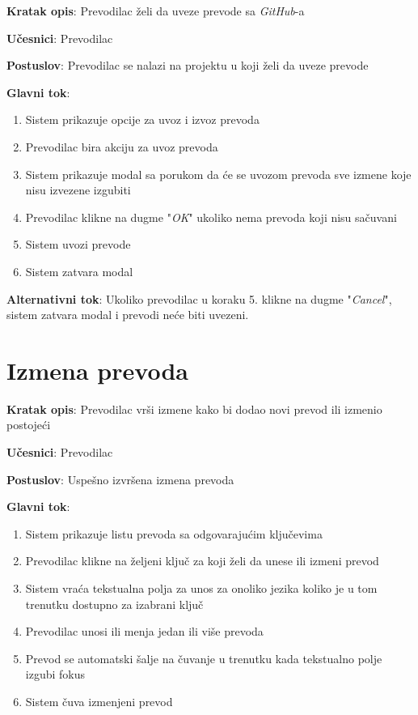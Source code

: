 \textbf{Kratak opis}: Prevodilac želi da uveze prevode sa \textit{GitHub}-a

\textbf{Učesnici}: Prevodilac

\textbf{Postuslov}: Prevodilac se nalazi na projektu u koji želi da uveze prevode

\textbf{Glavni tok}:
\begin{enumerate}
    \item Sistem prikazuje opcije za uvoz i izvoz prevoda
    \item Prevodilac bira akciju za uvoz prevoda
    \item Sistem prikazuje modal sa porukom da će se uvozom prevoda sve 
    izmene koje nisu izvezene izgubiti
    \item Prevodilac klikne na dugme "\textit{OK}" ukoliko nema prevoda koji nisu sačuvani
    \item Sistem uvozi prevode
    \item Sistem zatvara modal
\end{enumerate}

\textbf{Alternativni tok}: Ukoliko prevodilac u koraku 5. klikne na dugme "\textit{Cancel}", 
sistem zatvara modal i prevodi neće biti uvezeni.


\section{Izmena prevoda}

\textbf{Kratak opis}: Prevodilac vrši izmene kako bi dodao novi prevod ili izmenio postojeći

\textbf{Učesnici}: Prevodilac

\textbf{Postuslov}: Uspešno izvršena izmena prevoda

\textbf{Glavni tok}:
\begin{enumerate}
    \item Sistem prikazuje listu prevoda sa odgovarajućim ključevima
    \item Prevodilac klikne na željeni ključ za koji želi da unese ili izmeni prevod
    \item Sistem vraća tekstualna polja za unos za onoliko jezika koliko je u tom 
    trenutku dostupno za izabrani ključ
    \item Prevodilac unosi ili menja jedan ili više prevoda
    \item Prevod se automatski šalje na čuvanje u trenutku kada tekstualno polje izgubi fokus
    \item Sistem čuva izmenjeni prevod
\end{enumerate}

